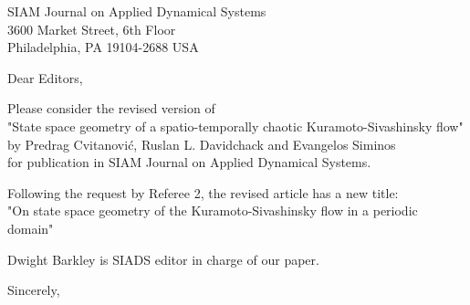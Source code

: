 \documentclass[11pt]{letter}
\date{April 10, 2009}
\begin{document}
\begin{letter}{
SIAM Journal on Applied Dynamical Systems\\
3600 Market Street, 6th Floor\\
Philadelphia, PA 19104-2688 USA
}


\opening{Dear Editors,}

Please consider the revised version of
\\
"State space geometry of a spatio-temporally chaotic Kuramoto-Sivashinsky flow"
\\
by Predrag Cvitanovi\'c, Ruslan L. Davidchack and Evangelos Siminos
\\
for publication in SIAM Journal on
Applied Dynamical Systems.

Following the request by Referee 2, the revised article has a new title:
\\
"On state space geometry of the
Kuramoto-Sivashinsky flow in a periodic domain"


Dwight Barkley is SIADS editor in charge of our paper.

\closing{Sincerely,}


\end{letter}
\end{document}
